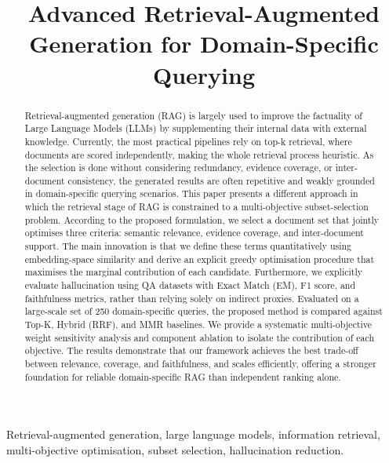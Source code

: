 \documentclass[conference]{IEEEtran}
\begin{document}
\title{Advanced Retrieval-Augmented Generation for Domain-Specific Querying}

\author{
}

\maketitle

\begin{abstract}
Retrieval-augmented generation (RAG) is largely used to improve the factuality of Large Language Models (LLMs) by supplementing their internal data with external knowledge. Currently, the most practical pipelines rely on top-k retrieval, where documents are scored independently, making the whole retrieval process heuristic. As the selection is done without considering redundancy, evidence coverage, or inter-document consistency, the generated results are often repetitive and weakly grounded in domain-specific querying scenarios. This paper presents a different approach in which the retrieval stage of RAG is constrained to a multi-objective subset-selection problem. According to the proposed formulation, we select a document set that jointly optimises three criteria: semantic relevance, evidence coverage, and inter-document support. The main innovation is that we define these terms quantitatively using embedding-space similarity and derive an explicit greedy optimisation procedure that maximises the marginal contribution of each candidate. Furthermore, we explicitly evaluate hallucination using QA datasets with Exact Match (EM), F1 score, and faithfulness metrics, rather than relying solely on indirect proxies. Evaluated on a large-scale set of 250 domain-specific queries, the proposed method is compared against Top-K, Hybrid (RRF), and MMR baselines. We provide a systematic multi-objective weight sensitivity analysis and component ablation to isolate the contribution of each objective. The results demonstrate that our framework achieves the best trade-off between relevance, coverage, and faithfulness, and scales efficiently, offering a stronger foundation for reliable domain-specific RAG than independent ranking alone.
\end{abstract}

\begin{IEEEkeywords}
Retrieval-augmented generation, large language models, information retrieval, multi-objective optimisation, subset selection, hallucination reduction.
\end{IEEEkeywords}
\end{document}

